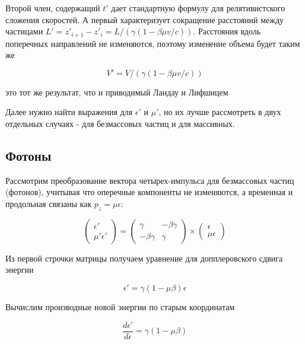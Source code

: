 Второй член, содержащий $t'$ дает стандартную формулу для релятивистского сложения скоростей. А первый характеризует сокращение расстояний между частицами $L' = z'_{i+1}-z'_i = L/(\gamma(1-\beta\mu v/c))$. Расстояния вдоль поперечных направлений не изменяются, поэтому изменение объема будет таким же

\begin{equation} \label{volume}
V' = V/(\gamma(1-\beta\mu v/c))
\end{equation}

это тот же результат, что и приводимый Ландау и Лифшицем \cite{LandauLifshitz2}

Далее нужно найти выражения для $\epsilon'$ и $\mu'$, но их лучше рассмотреть в двух отдельных случаях - для безмассовых частиц и для массивных.

\subsection{Фотоны}

Рассмотрим преобразование вектора четырех-импульса для безмассовых частиц (фотонов), учитывая что оперечные компоненты не изменяются, а временная и продольная связаны как $p_z = \mu \epsilon$:

\begin{equation}\label{lorentz_ph}
	\left(\begin{array}{c}
		\epsilon'\\
		\mu'\epsilon'
	\end{array}
	\right)
	= \left(
	\begin{array}{cc}
		\gamma & -\beta\gamma\\
		-\beta\gamma & \gamma
	\end{array}
	\right)
	\times
	\left(\begin{array}{c}
		\epsilon\\
		\mu\epsilon
	\end{array}
	\right)
\end{equation}

Из первой строчки матрицы получаем уравнение для допплеровского сдвига энергии

\begin{equation}\label{doppler_ph}
	\epsilon'=\gamma(1-\mu\beta)\epsilon
\end{equation}

Вычислим производные новой энергии по старым координатам

\begin{equation}
	\frac{d\epsilon'}{d\epsilon}=\gamma(1-\mu\beta)
\end{equation}

